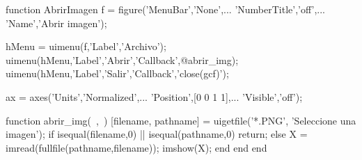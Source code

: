 \sol

\begin{matlab}
function AbrirImagen
f = figure('MenuBar','None',...
    'NumberTitle','off',...
    'Name','Abrir imagen');

hMenu = uimenu(f,'Label','Archivo');
uimenu(hMenu,'Label','Abrir','Callback',@abrir_img);
uimenu(hMenu,'Label','Salir','Callback','close(gcf)');

ax = axes('Units','Normalized',...
    'Position',[0 0 1 1],...
    'Visible','off');

    function abrir_img(~,~)
        [filename, pathname] = uigetfile('*.PNG', 'Seleccione una imagen');
        if isequal(filename,0) || isequal(pathname,0)
            return;
        else
            X = imread(fullfile(pathname,filename));
            imshow(X);
        end
    end
end
\end{matlab}
